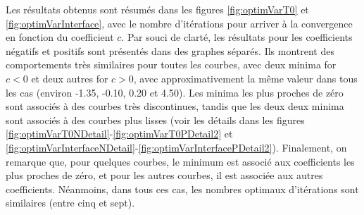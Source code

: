 \indent Les résultats obtenus sont résumés dans les figures \ref{fig:optimVarT0} et \ref{fig:optimVarInterface}, avec le nombre d'itérations pour arriver à la convergence en fonction du coefficient $c$. Par souci de clarté, les résultats pour les coefficients négatifs et positifs sont présentés dans des graphes séparés. Ils montrent des comportements très similaires pour toutes les courbes, avec deux minima for $c < 0$ et deux autres for $c > 0$, avec approximativement la même valeur dans tous les cas (environ -1.35, -0.10, 0.20 et 4.50). Les minima les plus proches de zéro sont associés à des courbes très discontinues, tandis que les deux deux minima sont associés à des courbes plus lisses (voir les détails dans les figures \ref{fig:optimVarT0NDetail}-\ref{fig:optimVarT0PDetail2} et \ref{fig:optimVarInterfaceNDetail}-\ref{fig:optimVarInterfacePDetail2}). Finalement, on remarque que, pour quelques courbes, le minimum est associé aux coefficients les plus proches de zéro, et pour les autres courbes, il est associée aux autres coefficients. Néanmoins, dans tous ces cas, les nombres optimaux d'itérations sont similaires (entre cinq et sept).

